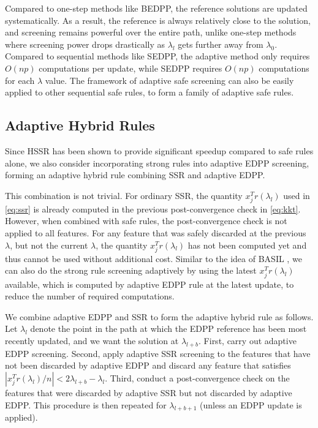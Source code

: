 Compared to one-step methods like BEDPP, the reference solutions are updated systematically. As a result, the reference is always relatively close to the solution, and screening remains powerful over the entire path, unlike one-step methods where screening power drops drastically as $\lambda_l$ gets further away from $\lambda_0$. Compared to sequential methods like SEDPP, the adaptive method only requires $O(np)$ computations per update, while SEDPP requires $O(np)$ computations for each $\lambda$ value. The framework of adaptive safe screening can also be easily applied to other sequential safe rules, to form a family of adaptive safe rules.

\subsection{Adaptive Hybrid Rules}
\label{sec:ahr}

Since HSSR \citep{Zeng2021} has been shown to provide significant speedup compared to safe rules alone, we also consider incorporating strong rules into adaptive EDPP screening, forming an adaptive hybrid rule combining SSR and adaptive EDPP.

This combination is not trivial. For ordinary SSR, the quantity $x_j^Tr(\lambda_l)$ used in \eqref{eq:ssr} is already computed in the previous post-convergence check in \eqref{eq:kkt}. However, when combined with safe rules, the post-convergence check is not applied to all features. For any feature that was safely discarded at the previous $\lambda$, but not the current $\lambda$, the quantity $x_j^Tr(\lambda_l)$ has not been computed yet and thus cannot be used without additional cost. Similar to the idea of BASIL \citep{qian2019fast}, we can also do the strong rule screening adaptively by using the latest $x_j^Tr(\lambda_l)$ available, which is computed by adaptive EDPP rule at the latest update, to reduce the number of required computations.

We combine adaptive EDPP and SSR to form the adaptive hybrid rule as follows. Let $\lambda_l$ denote the point in the path at which the EDPP reference has been most recently updated, and we want the solution at $\lambda_{l+b}$. First, carry out adaptive EDPP screening. Second, apply adaptive SSR screening to the features that have not been discarded by adaptive EDPP and discard any feature that satisfies $|x_j^Tr(\lambda_l)/n|<2\lambda_{l+b}-\lambda_l$. Third, conduct a post-convergence check on the features that were discarded by adaptive SSR but not discarded by adaptive EDPP. This procedure is then repeated for $\lambda_{l+b+1}$ (unless an EDPP update is applied).

